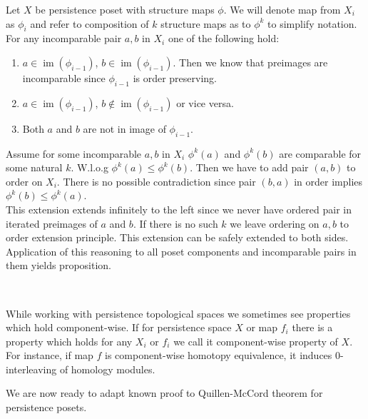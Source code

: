 \begin{pf}
  Let $X$ be persistence poset with structure maps $\phi$. We will denote map from $X_i$ as $\phi_i$ and refer to composition of $k$ structure maps as to $\phi^k$ to simplify notation.\\

  For any incomparable pair $a,b$ in $X_i$ one of the following hold:
  \begin{enumerate}
    \item $a \in \operatorname{im}(\phi_{i-1})$, $b \in \operatorname{im}(\phi_{i-1})$. Then we know that preimages are incomparable since $\phi_{i-1}$ is order preserving.
    \item $a \in \operatorname{im}(\phi_{i-1})$, $b \not\in \operatorname{im}(\phi_{i-1})$ or vice versa.
    \item Both $a$ and $b$ are not in image of $\phi_{i-1}$.
  \end{enumerate}

  Assume for some incomparable $a,b$ in $X_i$ $\phi^k(a)$ and $\phi^k(b)$ are comparable for some natural $k$. W.l.o.g $\phi^k(a) \leq \phi^k(b)$. Then we have to add pair $(a,b)$ to order on $X_i$. There is no possible contradiction since pair $(b,a)$ in order implies $\phi^k(b) \leq \phi^k(a)$.\\
  This extension extends infinitely to the left since we never have ordered pair in iterated preimages of $a$ and $b$. If there is no such $k$ we leave ordering on $a,b$ to order extension principle. This extension can be safely extended to both sides.\\

  Application of this reasoning to all poset components and incomparable pairs in them yields proposition.
\end{pf}\\

\begin{remark}
  While working with persistence topological spaces we sometimes see properties which hold component-wise. If for persistence space $X$ or map $f_i$ there is a property which holds for any $X_i$ or $f_i$ we call it component-wise property of $X$. For instance, if map $f$ is component-wise homotopy equivalence, it induces $0$-interleaving of homology modules.
\end{remark}

We are now ready to adapt known proof to Quillen-McCord theorem for persistence posets.

